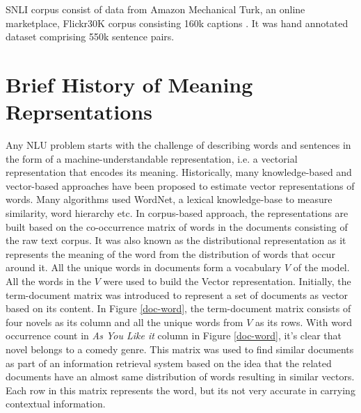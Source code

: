 \documentclass[12pt]{report} %
\begin{document}
  SNLI corpus consist of data from Amazon Mechanical Turk, an online marketplace, Flickr30K corpus consisting 160k captions \citep{bowman2015large}. It was hand annotated dataset comprising 550k sentence pairs.

\section{Brief History of Meaning Reprsentations}

Any NLU problem starts with the challenge of describing words and sentences in the form of a machine-understandable representation, i.e. a vectorial representation that encodes its meaning. Historically, many knowledge-based and vector-based approaches have been proposed to estimate vector representations of words. Many algorithms used WordNet, a lexical knowledge-base to measure similarity, word hierarchy etc.   In corpus-based approach, the representations are built based on the co-occurrence matrix of words in the documents consisting of the raw text corpus. It was also known as the distributional representation as it represents the meaning of the word from the distribution of words that occur around it. All the unique words in documents form a vocabulary $V$ of the model. All the words in the $V$ were used to build the Vector representation. Initially, the term-document matrix was introduced to represent a set of documents as vector based on its content. In Figure \ref{doc-word}, the term-document matrix consists of four novels as its column and all the unique words from $V$ as its rows. With word occurrence count in \textit{As You Like it} column in Figure \ref{doc-word}, it's clear that novel belongs to a comedy genre.  This matrix was used to find similar documents as part of an information retrieval system \citep{salton1971smart} based on the idea that the related documents have an almost same distribution of words resulting in similar vectors.  Each row in this matrix represents the word, but its not very accurate in carrying contextual information. 
\end{document}
